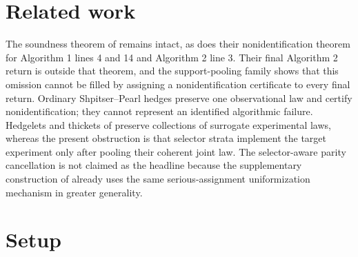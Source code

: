 \documentclass{article}
\begin{document}
\section{Related work}

The soundness theorem of \cite{LeeGhassamiShpitser2024Systematic} remains intact, as does their nonidentification theorem for Algorithm 1 lines 4 and 14 and Algorithm 2 line 3. Their final Algorithm 2 return is outside that theorem, and the support-pooling family shows that this omission cannot be filled by assigning a nonidentification certificate to every final return. Ordinary Shpitser--Pearl hedges preserve one observational law and certify nonidentification; they cannot represent an identified algorithmic failure. Hedgelets and thickets of \cite{LeeCorreaBareinboim2020General} preserve collections of surrogate experimental laws, whereas the present obstruction is that selector strata implement the target experiment only after pooling their coherent joint law. The selector-aware parity cancellation is not claimed as the headline because the supplementary construction of \cite{LeeGhassamiShpitser2024Systematic} already uses the same serious-assignment uniformization mechanism in greater generality.

\section{Setup}
\end{document}
